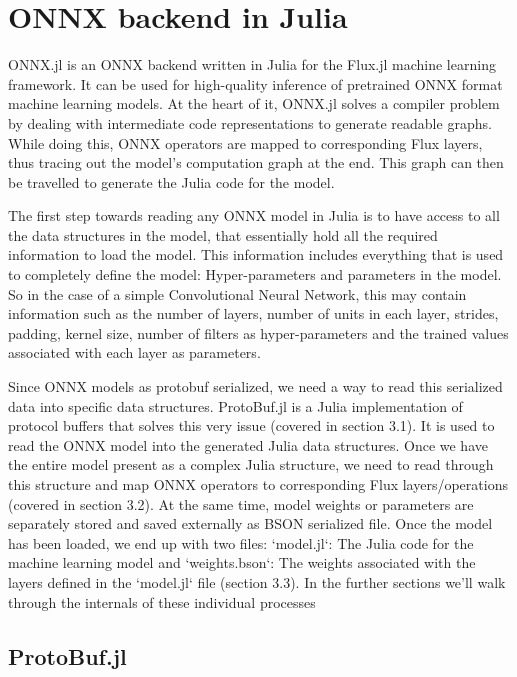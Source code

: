 \documentclass{juliacon}
\begin{document}
\section{ONNX backend in Julia}

ONNX.jl is an ONNX backend written in Julia for the Flux.jl machine learning framework. It can be
used for high-quality inference of pretrained ONNX format machine learning models. At the heart of it, ONNX.jl solves a compiler problem by dealing with intermediate code representations to generate readable graphs. While doing this, ONNX operators are mapped to corresponding Flux layers, thus tracing out the model's computation graph at the end. This graph can then be travelled to generate the Julia code for the model.  

The first step towards reading any ONNX model in Julia is to have access to all the data structures in the model,
that essentially hold all the required information to load the model. This information includes everything that
is used to completely define the model: Hyper-parameters and parameters in the model. So in the case of a simple
Convolutional Neural Network, this may contain information such as the number of layers, number of units in each 
layer, strides, padding, kernel size, number of filters as hyper-parameters and the trained values associated
with each layer as parameters.  

Since ONNX models as protobuf serialized, we need a way to read this serialized data into specific data
structures. ProtoBuf.jl is a Julia implementation of protocol buffers that solves this very issue (covered in 
section 3.1). It is used to read the ONNX model into the generated Julia data structures. Once we have the 
entire model present as a complex Julia structure, we need to read through this structure and map ONNX operators
to corresponding Flux layers/operations (covered in section 3.2). At the same time, model weights or 
parameters are separately stored and saved externally as BSON serialized file. Once the model has been loaded,
we end up with two files: `model.jl`: The Julia code for the machine learning model and `weights.bson`: The 
weights associated with the layers defined in the `model.jl` file (section 3.3). In the further sections we'll walk through the internals of these individual processes 

\subsection{ProtoBuf.jl}
\end{document}
